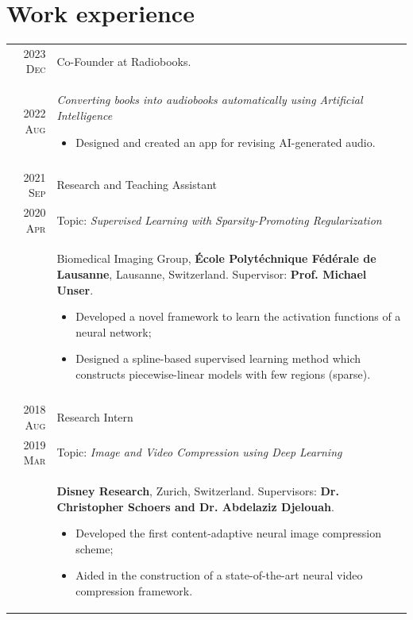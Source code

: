 \documentclass[a4paper,11pt]{article}
\begin{document}
  \vspace{15pt}

  \section{Work experience}

    \begin{tabular}{r|p{13cm}}

      \textsc{2023 Dec} 	& Co-Founder at Radiobooks. \\
      \textsc{2022 Aug} 	& \emph{Converting books into audiobooks automatically using Artificial Intelligence}
      \begin{itemize}[leftmargin=*,noitemsep]
          \item \footnotesize{Designed and created an app for revising AI-generated audio.}
      \end{itemize} \vspace*{-\baselineskip}\\
      \multicolumn{2}{c}{} \\


      \textsc{2021 Sep} 	& Research and Teaching Assistant \\
      \textsc{2020 Apr} 	& Topic: \emph{Supervised Learning with Sparsity-Promoting Regularization} \\
				& \footnotesize{ Biomedical Imaging Group, \textbf{École Polytéchnique Fédérale de Lausanne}, Lausanne, Switzerland. Supervisor: \textbf{Prof. Michael Unser}.
				  }
        \begin{itemize}[leftmargin=*,noitemsep]
          \item \footnotesize{Developed a novel framework to learn the activation functions of a neural network;}
          \item \footnotesize{Designed a spline-based supervised learning method which constructs piecewise-linear models with few regions (sparse).}
        \end{itemize} \vspace*{-\baselineskip}\\
      \multicolumn{2}{c}{} \\

      \textsc{2018 Aug} & Research Intern \\
      \textsc{2019 Mar} & Topic: \emph{Image and Video Compression using Deep Learning} \\
				& \footnotesize{\textbf{Disney Research}, Zurich, Switzerland. Supervisors: \textbf{Dr. Christopher Schoers and Dr. Abdelaziz Djelouah}.}
        \begin{itemize}[leftmargin=*,noitemsep]
          \item \footnotesize{
            Developed the first content-adaptive neural image compression scheme;}
          \item  \footnotesize{
            Aided in the construction of a state-of-the-art neural video compression framework.}
          \end{itemize} \vspace*{-\baselineskip}


\end{tabular}
\end{document}
